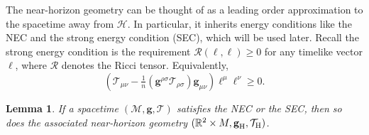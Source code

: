 \documentclass[11pt, reqno]{amsart}
\newcommand{\R}{\mathbb{R}}
\theoremstyle{plain}
\newtheorem{lemma}[theorem]{Lemma}
\theoremstyle{definition}
\numberwithin{equation}{section}
\begin{document}
The near-horizon geometry can be thought of as a leading order approximation to the spacetime away from $\mathcal{H}$. In particular,  it inherits energy conditions like the NEC and the strong energy condition (SEC), which will be used later. Recall the strong energy condition is the requirement $\mathcal{R}(\ell,\ell) \geq 0$ for any timelike vector $\ell$, where $\mathcal{R}$ denotes the Ricci tensor. Equivalently,
\begin{equation}
(\mathcal{T}_{\mu\nu} - \tfrac 1n(\textbf{g}^{\rho\sigma}\mathcal{T}_{\rho\sigma})\textbf{g}_{\mu\nu})\ell^\mu\ell^\nu \geq 0.
\end{equation}
\begin{lemma} \label{lemec}
    If a spacetime $(\mathcal{M},\textbf{g},\mathcal{T})$ satisfies the NEC or the SEC, then so does the associated near-horizon geometry $(\R^2\times M, \textbf{g}_{\textup{H}},\mathcal{T}_{\textup{H}})$.
\end{lemma}
\end{document}
